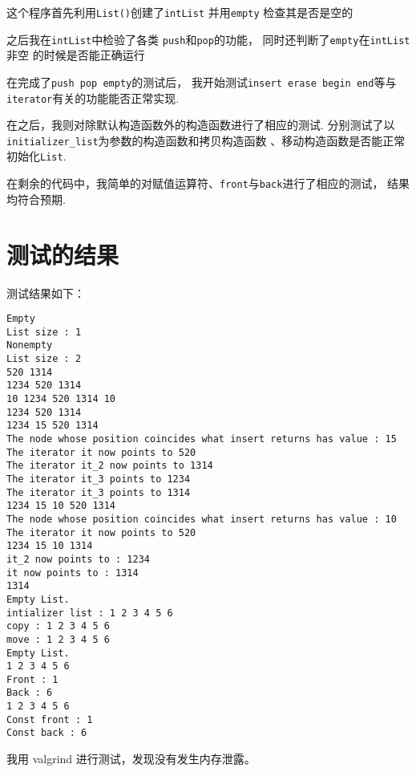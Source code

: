 \documentclass[UTF8]{ctexart}
\begin{document}
这个程序首先利用\texttt{List()}创建了\texttt{intList}
并用\texttt{empty}
检查其是否是空的\par
之后我在\texttt{intList}中检验了各类
\texttt{push}和\texttt{pop}的功能，
同时还判断了\texttt{empty}在\texttt{intList}非空
的时候是否能正确运行\par
在完成了\texttt{push pop empty}的测试后，
我开始测试\texttt{insert erase begin end}等与\texttt{iterator}有关的功能能否正常实现.\par
在之后，我则对除默认构造函数外的构造函数进行了相应的测试.
分别测试了以\texttt{initializer\_list}为参数的构造函数和拷贝构造函数
、移动构造函数是否能正常初始化\texttt{List}.\par
在剩余的代码中，我简单的对赋值运算符、\texttt{front}与\texttt{back}进行了相应的测试，
结果均符合预期.
\section{测试的结果}

测试结果如下：\begin{lstlisting}
Empty
List size : 1
Nonempty
List size : 2
520 1314 
1234 520 1314 
10 1234 520 1314 10 
1234 520 1314 
1234 15 520 1314 
The node whose position coincides what insert returns has value : 15
The iterator it now points to 520
The iterator it_2 now points to 1314
The iterator it_3 points to 1234
The iterator it_3 points to 1314
1234 15 10 520 1314 
The node whose position coincides what insert returns has value : 10
The iterator it now points to 520
1234 15 10 1314 
it_2 now points to : 1234
it now points to : 1314
1314 
Empty List.
intializer list : 1 2 3 4 5 6 
copy : 1 2 3 4 5 6 
move : 1 2 3 4 5 6 
Empty List.
1 2 3 4 5 6 
Front : 1
Back : 6
1 2 3 4 5 6 
Const front : 1
Const back : 6
\end{lstlisting}

我用 valgrind 进行测试，发现没有发生内存泄露。
\end{document}
